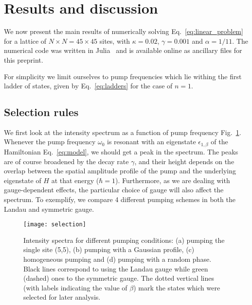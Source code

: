 \documentclass[twocolumn, 10pt, aps, superscriptaddress, floatfix, showpacs, prb, citeautoscript]{revtex4-1}
\newcommand{\co}[2]{#2}
\renewcommand{\paragraph}{\co}
\begin{document}
\section{Results and discussion}
\label{sec:results}

We now present the main results of numerically solving
Eq.~\eqref{eq:linear_problem} for a lattice of
$N \times N = 45 \times 45$ sites, with $\kappa = 0.02$,
$\gamma = 0.001$ and $\alpha = 1/11$.  The numerical code was written
in Julia~\cite{bezanson2014julia} and is available online as ancillary
files for this preprint.

For simplicity we limit ourselves to pump frequencies which lie
withing the first ladder of states, given by Eq.~\eqref{eq:ladders}
for the case of $n = 1$.


\subsection{Selection rules}
\label{sec:selection}

\paragraph{The overlap between the pump state and the eigenstate determines the intensity.}
We first look at the intensity spectrum as a function of pump
frequency Fig.~\ref{fig:pumping_schemes}.  Whenever the pump frequency
$\omega_0$ is resonant with an eigenstate $\epsilon_{1,\beta}$ of the
Hamiltonian Eq.~\eqref{eq:model}, we should get a peak in the
spectrum. The peaks are of course broadened by the decay rate
$\gamma$, and their height depends on the overlap between the spatial
amplitude profile of the pump and the underlying eigenstate of $H$ at
that energy ($\hbar = 1$). Furthermore, as we are dealing with
gauge-dependent effects, the particular choice of gauge will also
affect the spectrum. To exemplify, we compare 4 different pumping
schemes in both the Landau and symmetric gauge.
%
\begin{figure}[htb]\centering
  \texttt{[image: selection]}
  \caption{Intensity spectra for different pumping conditions: (a)
    pumping the single site (5,5), (b) pumping with a Gaussian
    profile, (c) homogeneous pumping and (d) pumping with a random
    phase. Black lines correspond to using the Landau gauge while
    green (dashed) ones to the symmetric gauge. The dotted vertical
    lines (with labels indicating the value of $\beta$)
    mark the states which were selected for later analysis.}
  \label{fig:pumping_schemes}
\end{figure}
\end{document}
